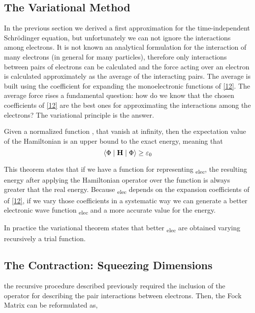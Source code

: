 \documentclass{tmr}
\begin{document}
\subsection{The Variational Method}

In the previous section we derived a first approximation for the time-independent 
Schr\"odinger equation, but unfortunately we can not ignore the interactions 
among electrons. It is not known an analytical formulation for the interaction
of many electrons (in general for many particles), therefore only 
interactions between pairs of electrons can be calculated and the
force acting over an electron is calculated approximately as
the average of the interacting pairs. The average is built using the coefficient
for expanding the monoelectronic functions of \eqref{12}. The average force
rises a fundamental question: how do we know that the chosen coefficients of \eqref{12}
are the best ones for approximating the interactions among the electrons? The variational
principle is the answer.

\begin{theorem}
Given a normalized function \textPhi, that vanish at infinity, then the expectation value 
of the Hamiltonian is an upper bound to the exact energy, meaning that
\[ \braket{\Phi \mid \mathbf{H} \mid \Phi} \geq \varepsilon_{0} \] 
\end{theorem}

This theorem states that if we have a function for representing \textPhi\textsubscript{elec},
the resulting energy after applying the Hamiltonian operator over the function is always greater
that the real energy. Because  \textPhi\textsubscript{elec} depends on the expansion coefficients of
 of \eqref{12}, if we vary those coefficients in a systematic way we can generate 
a better electronic wave function \textPhi\textsubscript{elec} and a more accurate value
for the energy.

In practice the variational theorem states that better \textPhi\textsubscript{elec} are
obtained varying recursively a trial function.

\subsection{The Contraction: Squeezing Dimensions}

the recursive procedure described previously required the inclusion of the operator
for describing the pair interactions between electrons. Then, the Fock Matrix can
be reformulated as,
\end{document}
